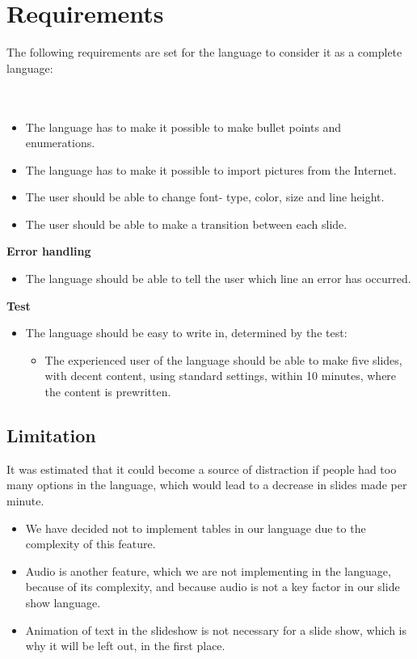 \section{Requirements}
The following requirements are set for the language to consider it as a complete language:
\\ \\
 \\
\begin{itemize}
\item The language has to make it possible to make bullet points and enumerations.
\item The language has to make it possible to import pictures from the Internet.
\item The user should be able to change font- type, color, size and line height.
\item The user should be able to make a transition between each slide. 
\end{itemize}
\textbf{Error handling}\\
\begin{itemize}
\item The language should be able to tell the user which line an error has occurred. 
\end{itemize}
\textbf{Test}\\
\begin{itemize}
\item The language should be easy to write in, determined by the test:
\begin{itemize}
\item The experienced user of the language should be able to make five slides, with decent content, using standard settings, within 10 minutes, where the content is prewritten.
\end{itemize}
\end{itemize}

\subsection*{Limitation}
It was estimated that it could become a source of distraction if people had too many options in the language, which would lead to a decrease in slides made per minute.

\begin{itemize}
	\item We have decided not to implement tables in our language due to the complexity of this feature.
	\item Audio is another feature, which we are not implementing in the language, because of its complexity, and because audio is not a key factor in our slide show language.
	\item Animation of text in the slideshow is not necessary for a slide show, which is why it will be left out, in the first place.
\end{itemize}